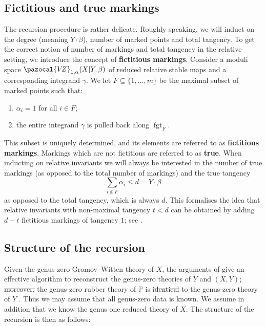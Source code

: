 \documentclass[11pt]{amsart}
\newcommand{\VZ}{\pazocal{V\!Z}}
\newcommand{\fgt}{\operatorname{fgt}}
\theoremstyle{definition}
\theoremstyle{definition}
\providecommand{\DIFaddtex}[1]{{\protect\color{blue}\uwave{#1}}} %
\providecommand{\DIFdeltex}[1]{{\protect\color{red}\sout{#1}}}                      %
\providecommand{\DIFaddbegin}{} %
\providecommand{\DIFaddend}{} %
\providecommand{\DIFdelbegin}{} %
\providecommand{\DIFdelend}{} %
\providecommand{\DIFadd}[1]{\texorpdfstring{\DIFaddtex{#1}}{#1}} %
\providecommand{\DIFdel}[1]{\texorpdfstring{\DIFdeltex{#1}}{}} %
\begin{document}
\subsection{Fictitious and true markings} The recursion procedure is rather delicate. Roughly speaking, we will induct on the degree (meaning $Y\cdot\beta$), number of marked points and total tangency. To get the correct notion of number of markings and total tangency in  the relative setting, we introduce the concept of \textbf{fictitious markings}. Consider a moduli space $\VZ_{1,\alpha}(X|Y,\beta)$ of reduced relative stable maps and a corresponding integrand $\gamma$. We let $F \subseteq \{1,\ldots,m\}$ be the maximal subset of marked points such that:
 \begin{enumerate} 
\item $\alpha_i = 1$ for all $i \in F$;
\item the entire integrand $\gamma$ is pulled back along $\fgt_F$.
 \end{enumerate} 
This subset is uniquely determined, and its elements are referred to as \textbf{fictitious markings}. Markings which are not fictitious are referred to as \textbf{true}. When inducting on relative invariants we will always be interested in the number of true markings (as opposed to the total number of markings) and the true tangency
\begin{equation*} \sum_{i \not\in F} \alpha_i \leq d=Y\cdot \beta \end{equation*}
as opposed to the total tangency, which is always $d$. This formalises the idea that relative invariants with non-maximal tangency $t<d$ can be obtained by adding $d-t$ fictitious markings of tangency $1$; see \cite[Lemma 1.15(i)]{Ga}.

\subsection{Structure of the recursion} Given the genus-zero Gromov--Witten theory of $X$, the arguments of \cite{Ga} give an effective algorithm to reconstruct the genus-zero theories of $Y$ and $(X,Y)$; \DIFdelbegin \DIFdel{moreover, }\DIFdelend the genus-zero rubber theory of $\mathbb{P}$ is \DIFdelbegin \DIFdel{identical }\DIFdelend \DIFaddbegin \DIFadd{equal }\DIFaddend to the genus-zero theory of $Y$ \cite{GathmannThesis}. Thus we may assume that all genus-zero data is known. We assume in addition that we know the genus one reduced theory of $X$. The structure of the recursion is then as follows:
\end{document}
